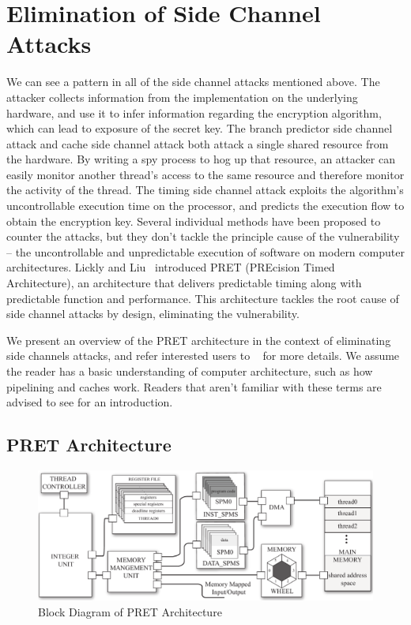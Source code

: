 \documentclass[times, 10pt,twocolumn]{article}
\begin{document}
\section{Elimination of Side Channel Attacks}
We can see a pattern in all of the side channel attacks mentioned above. The attacker collects information from the implementation on the underlying hardware, and use it to infer information regarding the encryption algorithm, which can lead to exposure of the secret key. The branch predictor side channel attack and cache side channel attack both attack a single shared resource from the hardware. By writing a spy process to hog up that resource, an attacker can easily monitor another thread's access to the same resource and therefore monitor the activity of the thread. The timing side channel attack exploits the algorithm's uncontrollable execution time on the processor, and predicts the execution flow to obtain the encryption key. Several individual methods have been proposed to counter the attacks, but they don't tackle the principle cause of the vulnerability -- the uncontrollable and unpredictable execution of software on modern computer architectures. Lickly and Liu~\cite{pret_cases08} introduced PRET (PREcision Timed Architecture), an architecture that delivers predictable timing along with predictable function and performance. This architecture tackles the root cause of side channel attacks by design, eliminating the vulnerability.

We present an overview of the PRET architecture in the context of eliminating side channels attacks, and refer interested users to ~\cite{pret_cases08} for more details. We assume the reader has a basic understanding of computer architecture, such as how pipelining and caches work. Readers that aren't familiar with these terms are advised to see \cite{patterson2005coa} for an introduction.

\subsection{PRET Architecture}

\begin{figure}[ht]
  \centering
  \includegraphics[scale=.25]{./images/top_arch.pdf}
  \caption{Block Diagram of PRET Architecture}
  \label{fig:top_arch}
\end{figure}
\end{document}
